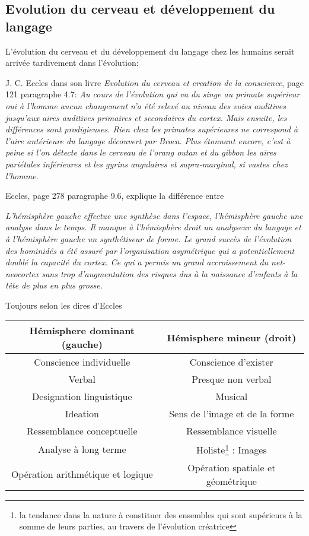 \documentclass[french, a4paper, 10pt]{article}
\begin{document}
\subsection{Evolution du cerveau et développement du langage}

L'évolution du cerveau et du développement du langage chez les humains serait
arrivée tardivement dans l'évolution:

J. C. Eccles dans son livre \emph{Evolution du cerveau et creation de la
conscience}, page 121 paragraphe 4.7: \emph{Au cours de l'évolution qui va du
singe au primate supérieur oui à l'homme aucun changement n'a été relevé au
niveau des voies auditives jusqu'aux aires auditives primaires et secondaires du
cortex. Mais ensuite, les différences sont prodigieuses. Rien chez les primates
supérieures ne correspond à l'aire antérieure du langage découvert par
Broca. Plus étonnant encore, c'est à peine si l'on détecte dans le cerveau de
l'orang outan et du gibbon les aires pariétales inférieures et les gyrins
angulaires et supra-marginal, si vastes chez l'homme.}

Eccles, page 278 paragraphe 9.6, explique la différence entre

\emph{L'hémisphère gauche effectue une synthèse dans l'espace, l'hémisphère
gauche une analyse dans le temps. Il manque à l'hémisphère droit un analyseur du
langage et à l'hémisphère gauche un synthétiseur de forme. Le grand succès de
l'évolution des hominidés a été assuré par l'organisation asymétrique qui a
potentiellement doublé la capacité du cortex. Ce qui a permis un grand
accroissement du net-neocortex sans trop d'augmentation des risques dus à la
naissance d'enfants à la tête de plus en plus grosse.}

Toujours selon les dires d'Eccles

\begin{savenotes}
\begin{center}
  \begin{tabular}{|c|c|} \hline
    Hémisphere dominant (gauche) & Hémisphere mineur (droit) \\ \hline
    Conscience individuelle & Conscience d'exister \\ \hline
    Verbal  & Presque non verbal \\ \hline
    Designation linguistique   & Musical \\ \hline
    Ideation   & Sens de l'image et de la forme \\ \hline
    Ressemblance conceptuelle  & Ressemblance visuelle \\ \hline
    Analyse à long terme & Holiste\footnote{la tendance dans la nature à constituer des ensembles qui sont supérieurs à la somme de leurs parties, au travers de l'évolution créatrice} : Images \\ \hline
    Opération arithmétique et logique & Opération spatiale et géométrique \\ \hline
  \end{tabular}
\end{center}
\end{savenotes}
\end{document}
